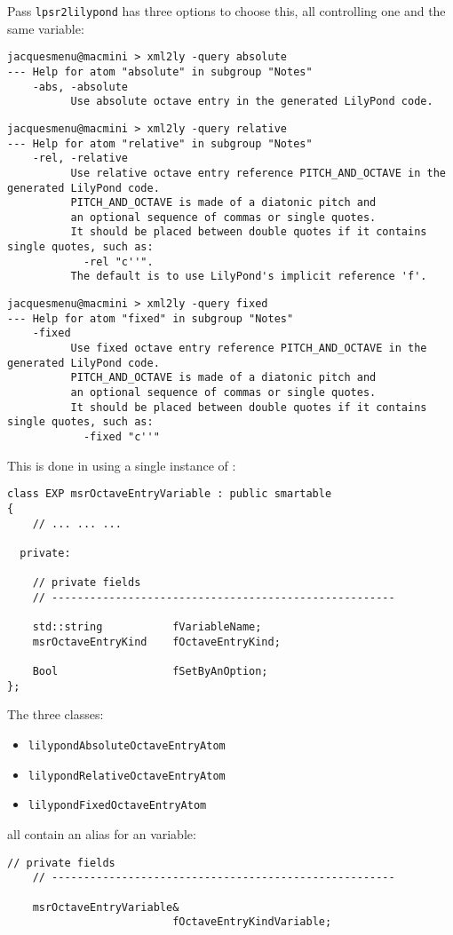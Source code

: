 Pass {\tt lpsr2lilypond} has three options to choose this, all controlling one and the same variable:
\begin{lstlisting}[language=Terminal]
jacquesmenu@macmini > xml2ly -query absolute
--- Help for atom "absolute" in subgroup "Notes"
    -abs, -absolute
          Use absolute octave entry in the generated LilyPond code.
\end{lstlisting}

\begin{lstlisting}[language=Terminal]
jacquesmenu@macmini > xml2ly -query relative
--- Help for atom "relative" in subgroup "Notes"
    -rel, -relative
          Use relative octave entry reference PITCH_AND_OCTAVE in the generated LilyPond code.
          PITCH_AND_OCTAVE is made of a diatonic pitch and
          an optional sequence of commas or single quotes.
          It should be placed between double quotes if it contains single quotes, such as:
            -rel "c''".
          The default is to use LilyPond's implicit reference 'f'.
\end{lstlisting}

\begin{lstlisting}[language=Terminal]
jacquesmenu@macmini > xml2ly -query fixed
--- Help for atom "fixed" in subgroup "Notes"
    -fixed
          Use fixed octave entry reference PITCH_AND_OCTAVE in the generated LilyPond code.
          PITCH_AND_OCTAVE is made of a diatonic pitch and
          an optional sequence of commas or single quotes.
          It should be placed between double quotes if it contains single quotes, such as:
            -fixed "c''"
\end{lstlisting}

This is done in  using a single instance of :
\begin{lstlisting}[language=CPlusPlus]
class EXP msrOctaveEntryVariable : public smartable
{
	// ... ... ...

  private:

    // private fields
    // ------------------------------------------------------

    std::string           fVariableName;
    msrOctaveEntryKind    fOctaveEntryKind;

    Bool                  fSetByAnOption;
};

\end{lstlisting}

The three classes:
\begin{itemize}
\item  {\tt lilypondAbsoluteOctaveEntryAtom}
\item  {\tt lilypondRelativeOctaveEntryAtom}
\item  {\tt lilypondFixedOctaveEntryAtom}
\end{itemize}
all contain an alias for an  variable:
\begin{lstlisting}[language=CPlusPlus]
    // private fields
    // ------------------------------------------------------

    msrOctaveEntryVariable&
                          fOctaveEntryKindVariable;
\end{lstlisting}


